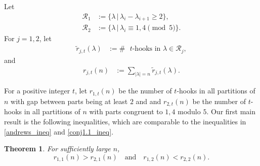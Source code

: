 \documentclass[11pt,reqno]{amsart}
\newtheorem{theorem}{Theorem}[section]
\theoremstyle{remark}
\numberwithin{equation}{section}
\begin{document}
Let 
\begin{align*}
	\mathcal{R}_1&:=\{\lambda \, |\, \lambda_{i}-\lambda_{i+1} \ge 2 \},\\
	\mathcal{R}_2&:=\{\lambda \, |\, \lambda_{i}\equiv 1,4 \pmod{5}\}.%
\end{align*} 
For $j=1,2$, let 
\begin{align*}
	\widetilde{r}_{j, t} (\lambda)&:= \# \text{ $t$-hooks in $\lambda \in \mathcal{R}_j$},
\end{align*}
and
\begin{align*}
	r_{j,t}(n)&:=\sum_{|\lambda|=n} \widetilde{r}_{j,t} (\lambda).
\end{align*}
\fi

For a positive integer $t$, let $r_{1,t}(n)$ be the number of $t$-hooks in all partitions of $n$ with gap between parts being at least $2$ and and $r_{2,t}(n)$ be the number of $t$-hooks in all partitions of $n$ with parts congruent to $1,4$ modulo $5$.  Our first main result is the following inequalities, which are comparable to the inequalities in \eqref{andrews_ineq} and \eqref{conj1.1_ineq}.

\begin{theorem}\label{thm:r_ineq}
	For sufficiently large $n$, 
	\[
		r_{1,1} (n) > r_{2,1}(n) \quad\text{and}\quad r_{1,2} (n) < r_{2,2} (n). 
	\]
\end{theorem}

\end{document}
